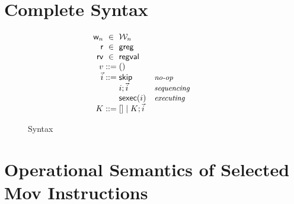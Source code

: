 \documentclass[acmsmall]{acmart}
\begin{document}

%










\begin{appendix}
\section{Complete Syntax}
\label{appendix:syntax}
\begin{figure}[!ht]
\newcommand{\commentary}[1]{ & \text{\small\it #1} \\}
\[
  \begin{array}{r@{\;}c@{\;}l}
    \loc & \in & \Loc \\
    \reg & \in & \regset \\
    \regval & \in & \regvaltype \\
    \val & ::= & \vunit

\\
    \instrs & ::= &
    \begin{array}[t]{@{}l@{\hspace{10mm}}l@{}}
    \begin{array}[t]{@{}ll@{}}
      \iskip
                   \commentary{no-op}
      \iseq\instr\instrs
                   \commentary{sequencing}
      \ising\instr
                   \commentary{executing}             
    \end{array}
    \end{array}
    \\

    \ectx & ::= &
      \hole \mid
      \iseq\ectx\instrs 
    \\
  \end{array}
\]
\caption{Syntax}
\label{fig:syntax}
\end{figure}
\section{Operational Semantics of Selected Mov Instructions}
\label{appendix:movops}



\end{appendix}
\end{document}
